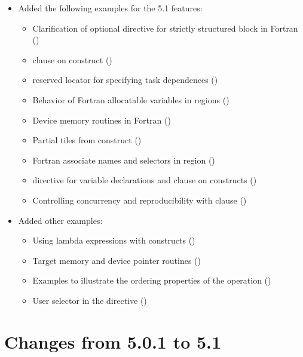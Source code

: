 \begin{itemize}
\item Added the following examples for the 5.1 features:
\begin{itemize}
  \item Clarification of optional  directive for strictly structured 
      block in Fortran ()
  \item {} clause on  construct ()
  \item {} reserved locator for specifying task dependences
      ()
  \item Behavior of Fortran allocatable variables in  regions
      ()
  \item Device memory routines in Fortran
      ()
  \item Partial tiles from  construct
      ()
  \item Fortran associate names and selectors in  region
      ()
  \item {} directive for variable declarations and 
       clause on  constructs
      ()
  \item Controlling concurrency and reproducibility with  clause
      ()
\end{itemize}

\item Added other examples:
\begin{itemize}
  \item Using lambda expressions with  constructs
     ()
  \item Target memory and device pointer routines
     ()
  \item Examples to illustrate the ordering properties of 
     the  operation ()
  \item User selector in the  directive
     ()
\end{itemize}

\end{itemize}

\section{Changes from 5.0.1 to 5.1}
\label{sec:history_501_to_51}

